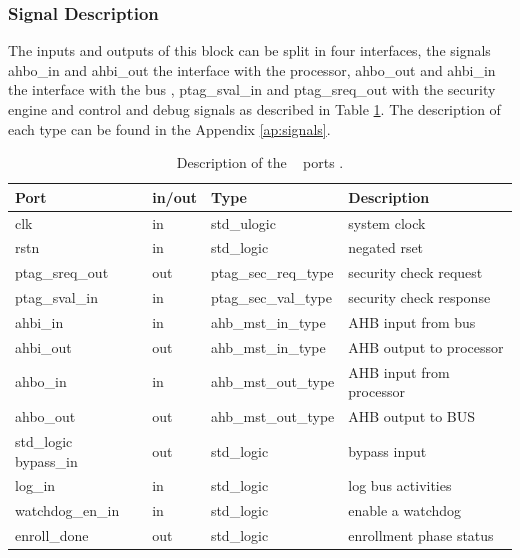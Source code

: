 \subsubsection{Signal Description}

The inputs and outputs of this block can be split in four interfaces,
the signals  ahbo\_in and ahbi\_out the interface with the processor,  ahbo\_out  and ahbi\_in
the interface with the bus , ptag\_sval\_in and ptag\_sreq\_out with the security engine  and control and debug signals as described in Table \ref{table:shports}.
 The description of each type can be found in the Appendix \ref{ap:signals}.
\begin{table}[H]
\begin{tabular}{l l l l}
\textbf{Port}   & \textbf{in/out} & \textbf{Type}        & \textbf{Description} 	\\ \hline \hline
clk             & in              & std\_ulogic          & system clock         	\\ \hline
rstn            & in              & std\_logic           & negated rset         	\\ \hline
ptag\_sreq\_out & out             & ptag\_sec\_req\_type & security check request    	\\ \hline
ptag\_sval\_in  & in              & ptag\_sec\_val\_type & security check response  	\\ \hline
ahbi\_in        & in              & ahb\_mst\_in\_type   & AHB input from bus      	\\ \hline
ahbi\_out       & out             & ahb\_mst\_in\_type   & AHB output to processor      \\ \hline
ahbo\_in        & in              & ahb\_mst\_out\_type  & AHB input from processor    \\ \hline
ahbo\_out       & out             & ahb\_mst\_out\_type  & AHB output to BUS            \\ \hline
std\_logic         
bypass\_in      & out             & std\_logic           & bypass input         	\\ \hline
log\_in         & in              & std\_logic           & log bus activities       \\ \hline
watchdog\_en\_in  & in            & std\_logic           & enable a watchdog             \\ \hline
enroll\_done     & out             & std\_logic          & enrollment phase status            \\ \hline

\end{tabular}
 \caption{Description of the \handler~ ports .}
 \label{table:shports}

\end{table}

